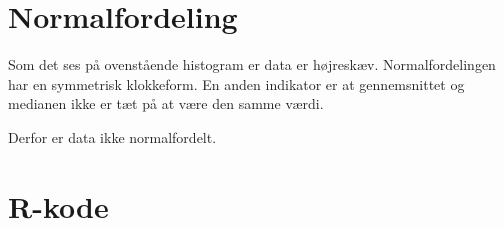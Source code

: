 \documentclass{article}
\begin{document}
\section{Normalfordeling}
Som det ses på ovenstående histogram er data er højreskæv. Normalfordelingen har
en symmetrisk klokkeform. En anden indikator er at gennemsnittet og medianen
ikke er tæt på at være den samme værdi.

Derfor er data ikke normalfordelt.

\newpage
\section{R-kode}

\end{document}
